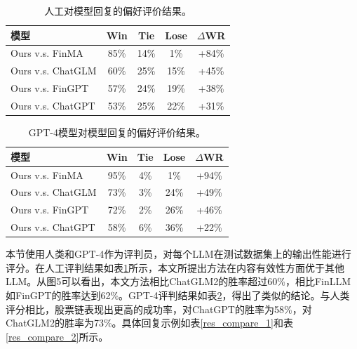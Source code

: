 \begin{table}
	\caption{\label{human_pk_table}人工对模型回复的偏好评价结果。}
	\centering{}%
	\small 
	\begin{tabular}{lcccc}
		\toprule[2pt]
		模型 & Win & Tie & Lose & $\Delta$WR \\
		\hline
		Ours v.s. FinMA & 85\% & 14\% & 1\% & +84\% \\
		Ours v.s. ChatGLM & 60\% & 25\% & 15\% & +45\% \\
		Ours v.s. FinGPT & 57\% & 24\% & 19\% & +38\% \\
		Ours v.s. ChatGPT & 53\% & 25\% & 22\% & +31\% \\
		\bottomrule[2pt]
	\end{tabular}
\end{table}

\begin{table}
	\caption{\label{gpt_pk_table}GPT-4模型对模型回复的偏好评价结果。}
	\centering{}%
	\small 
	\begin{tabular}{lcccc}
		\toprule[2pt]
		模型 & Win & Tie & Lose & $\Delta$WR \\
		\hline
		Ours v.s. FinMA & 95\% & 4\% & 1\% & +94\% \\
		Ours v.s. ChatGLM & 73\% & 3\% & 24\% & +49\% \\
		Ours v.s. FinGPT & 72\% & 2\% & 26\% & +46\% \\
		Ours v.s. ChatGPT & 58\% & 6\% & 36\% & +22\% \\
		\bottomrule[2pt]
	\end{tabular}
\end{table}

本节使用人类和GPT-4作为评判员，对每个LLM在测试数据集上的输出性能进行评分。在人工评判结果如表\ref{human_pk_table}所示，本文所提出方法在内容有效性方面优于其他LLM。从图5可以看出，本文方法相比ChatGLM2的胜率超过60\%，相比FinLLM如FinGPT的胜率达到62\%。GPT-4评判结果如表\ref{gpt_pk_table}，得出了类似的结论。与人类评分相比，股票链表现出更高的成功率，对ChatGPT的胜率为58\%，对ChatGLM2的胜率为73\%。具体回复示例如表\ref{res_compare_1}和表\ref{res_compare_2}所示。

